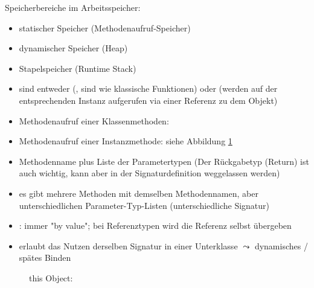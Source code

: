 Speicherbereiche im Arbeitsspeicher:
\begin{itemize}
	\item statischer Speicher (Methodenaufruf-Speicher)
	\item dynamischer Speicher (Heap)
	\item Stapelspeicher (Runtime Stack)
\end{itemize}

\begin{itemize}
	\item sind entweder  (, sind wie klassische Funktionen) oder  (werden auf der entsprechenden Instanz aufgerufen via einer Referenz zu dem Objekt)
	\item Methodenaufruf einer Klassenmethoden:\\ 
	\item Methodenaufruf einer Instanzmethode: siehe Abbildung \ref{Abb:thisObj}\\ 
	\item {} Methodenname plus Liste der Parametertypen
	(Der Rückgabetyp (Return) ist auch wichtig, kann aber  in der Signaturdefinition weggelassen werden)
	\item {} 
		es gibt mehrere Methoden mit demselben Methodennamen, aber unterschiedlichen Parameter-Typ-Listen (unterschiedliche Signatur)
	\item {}: immer "by value";
	bei Referenztypen wird die Referenz selbst übergeben
	\item {}
	erlaubt das Nutzen derselben Signatur in einer Unterklasse
	$\leadsto$ dynamisches / spätes Binden
\end{itemize}

\begin{figure}[H] %
	\begin{center}
		
		\caption{this Object: }
		\label{Abb:thisObj}
	\end{center}
\end{figure}

